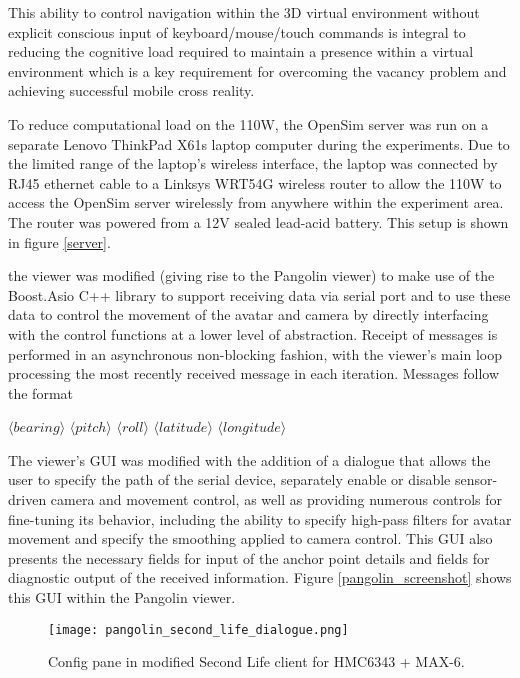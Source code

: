 This ability to control navigation within the 3D virtual environment without explicit conscious input of keyboard/mouse/touch commands is integral to reducing the cognitive load required to maintain a presence within a virtual environment which is a key requirement for overcoming the vacancy problem and achieving successful mobile cross reality.



To reduce computational load on the 110W, the OpenSim server was run on a separate Lenovo ThinkPad X61s laptop computer during the experiments. Due to the limited range of the laptop's wireless interface, the laptop was connected by RJ45 ethernet cable to a Linksys WRT54G wireless router to allow the 110W to access the OpenSim server wirelessly from anywhere within the experiment area. The router was powered from a 12V sealed lead-acid battery. This setup is shown in figure \ref{server}.





the viewer was modified (giving rise to the Pangolin viewer) to make use of the Boost.Asio C++ library to support receiving data via serial port and to use these data to control the movement of the avatar and camera by directly interfacing with the control functions at a lower level of abstraction. Receipt of messages is performed in an asynchronous non-blocking fashion, with the viewer's main loop processing the most recently received message in each iteration. Messages follow the format

$\langle bearing \rangle$ $\langle pitch \rangle$ $\langle roll \rangle$ $\langle latitude \rangle$ $\langle longitude \rangle$

The viewer's GUI was modified with the addition of a dialogue that allows the user to specify the path of the serial device, separately enable or disable sensor-driven camera and movement control, as well as providing numerous controls for fine-tuning its behavior, including the ability to specify high-pass filters for avatar movement and specify the smoothing applied to camera control. This GUI also presents the necessary fields for input of the anchor point details and fields for diagnostic output of the received information. Figure \ref{pangolin_screenshot} shows this GUI within the Pangolin viewer.

\begin{figure}[h]
\centering
  \texttt{[image: pangolin\_second\_life\_dialogue.png]}
  \caption{Config pane in modified Second Life client for HMC6343 + MAX-6.}
  \label{pangolin_second_life_dialogue.png}
\end{figure}

